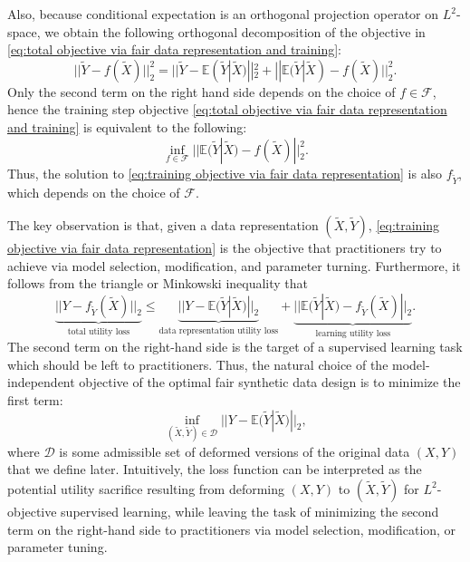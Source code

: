 \documentclass[twoside,11pt]{article}
\begin{document}
Also, because conditional expectation is an orthogonal projection operator on $L^2$-space, we obtain the following orthogonal decomposition of the objective in \eqref{eq:total objective via fair data representation and training}:
\begin{equation}
||\tilde{Y} - f(\tilde{X})||^2_2 = ||\tilde{Y} - \mathbb{E}(\tilde{Y}|\tilde{X})||^2_2 + ||\mathbb{E}(\tilde{Y}|\tilde{X}) - f(\tilde{X})||^2_2.
\end{equation}
Only the second term on the right hand side depends on the choice of $f \in \mathcal{F}$, hence the training step objective \eqref{eq:total objective via fair data representation and training} is equivalent to the following:
\begin{equation}\label{eq:training objective via fair data representation}
\inf_{f \in \mathcal{F}}  ||\mathbb{E}(\tilde{Y}|\tilde{X}) - f(\tilde{X})||^2_2.
\end{equation}
Thus, the solution to \eqref{eq:training objective via fair data representation} is also $f_{\tilde{Y}}$, which depends on the choice of $\mathcal{F}$. 

The key observation is that, given a data representation $(\tilde{X}, \tilde{Y})$, \eqref{eq:training objective via fair data representation} is the objective that practitioners try to achieve via model selection, modification, and parameter turning. Furthermore, it follows from the triangle or Minkowski inequality that
\begin{equation}\label{eq:decomposition of total objective}
\underbrace{||Y - f_{\tilde{Y}}(\tilde{X})||_2}_{\text{total utility loss}} \leq \underbrace{||Y - \mathbb{E}(\tilde{Y}|\tilde{X})||_2}_{\text{data representation utility loss}} + \underbrace{||\mathbb{E}(\tilde{Y}|\tilde{X}) - f_{\tilde{Y}}(\tilde{X})||_2}_{\text{learning utility loss}}.
\end{equation}
The second term on the right-hand side is the target of a supervised learning task which should be left to practitioners. Thus, the natural choice of the model-independent objective of the optimal fair synthetic data design is to minimize the first term:
\begin{equation}\label{eq:optimal fair data representation objective}
\inf_{(\tilde{X},\tilde{Y}) \in \mathcal{D}}||Y - \mathbb{E}(\tilde{Y}|\tilde{X})||_2,
\end{equation}
where $\mathcal{D}$ is some admissible set of deformed versions of the original data $(X,Y)$ that we define later. Intuitively, the loss function can be interpreted as the potential utility sacrifice resulting from deforming $(X,Y)$ to $(\tilde{X},\tilde{Y})$ for $L^2$-objective supervised learning, while leaving the task of minimizing the second term on the right-hand side to practitioners via model selection, modification, or parameter tuning.
\end{document}
